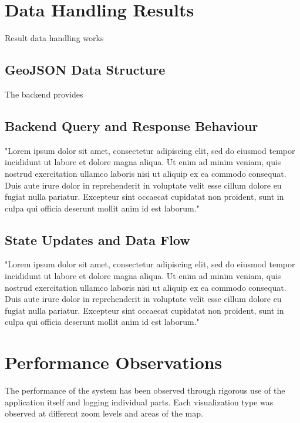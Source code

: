 \section{Data Handling Results}

Result data handling works 

\subsection{GeoJSON Data Structure}

The backend provides

\subsection{Backend Query and Response Behaviour}

"Lorem ipsum dolor sit amet, consectetur adipiscing elit, sed do eiusmod tempor incididunt ut labore et dolore magna aliqua. Ut enim ad minim veniam, quis nostrud exercitation ullamco laboris nisi ut aliquip ex ea commodo consequat. Duis aute irure dolor in reprehenderit in voluptate velit esse cillum dolore eu fugiat nulla pariatur. Excepteur sint occaecat cupidatat non proident, sunt in culpa qui officia deserunt mollit anim id est laborum."

\subsection{State Updates and Data Flow}

"Lorem ipsum dolor sit amet, consectetur adipiscing elit, sed do eiusmod tempor incididunt ut labore et dolore magna aliqua. Ut enim ad minim veniam, quis nostrud exercitation ullamco laboris nisi ut aliquip ex ea commodo consequat. Duis aute irure dolor in reprehenderit in voluptate velit esse cillum dolore eu fugiat nulla pariatur. Excepteur sint occaecat cupidatat non proident, sunt in culpa qui officia deserunt mollit anim id est laborum."

\section{Performance Observations}

The performance of the system has been observed through rigorous use of the application itself and logging individual parts. Each visualization type was observed at different zoom levels and areas of the map.  

